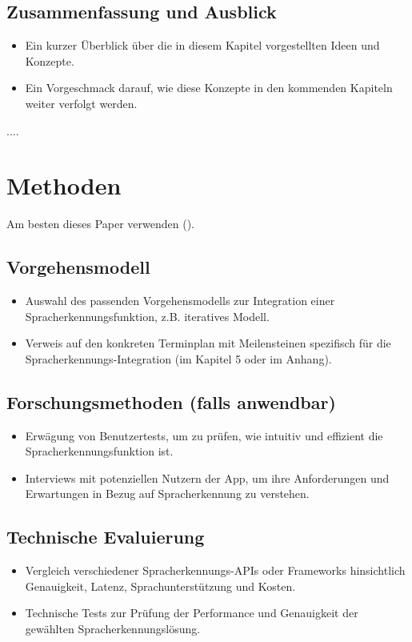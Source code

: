 \documentclass[11pt,a4paper]{article}
\begin{document}
\subsection{Zusammenfassung und Ausblick}
\begin{itemize}
    \item Ein kurzer Überblick über die in diesem Kapitel vorgestellten Ideen und Konzepte.
    \item Ein Vorgeschmack darauf, wie diese Konzepte in den kommenden Kapiteln weiter verfolgt werden.
\end{itemize}


....

\newpage \section{Methoden}
Am besten dieses Paper verwenden (\cite{choi2018tutorial}).

\subsection{Vorgehensmodell}
\begin{itemize}
    \item Auswahl des passenden Vorgehensmodells zur Integration einer Spracherkennungsfunktion, z.B. iteratives Modell.
    \item Verweis auf den konkreten Terminplan mit Meilensteinen spezifisch für die Spracherkennungs-Integration (im Kapitel 5 oder im Anhang).
\end{itemize}

\subsection{Forschungsmethoden (falls anwendbar)}
\begin{itemize}
    \item Erwägung von Benutzertests, um zu prüfen, wie intuitiv und effizient die Spracherkennungsfunktion ist.
    \item Interviews mit potenziellen Nutzern der App, um ihre Anforderungen und Erwartungen in Bezug auf Spracherkennung zu verstehen.
\end{itemize}

\subsection{Technische Evaluierung}
\begin{itemize}
    \item Vergleich verschiedener Spracherkennungs-APIs oder Frameworks hinsichtlich Genauigkeit, Latenz, Sprachunterstützung und Kosten.
    \item Technische Tests zur Prüfung der Performance und Genauigkeit der gewählten Spracherkennungslösung.
\end{itemize}
\end{document}
